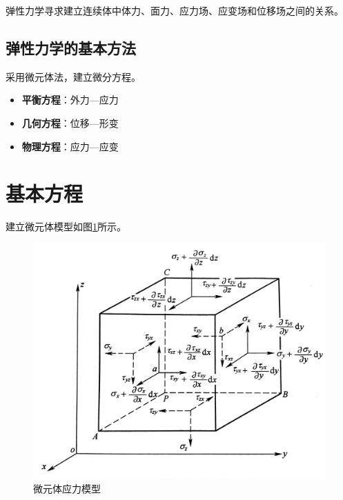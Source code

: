 \documentclass[10pt,a4]{article}
\numberwithin{equation}{section}
\begin{document}
	弹性力学寻求建立连续体中体力、面力、应力场、应变场和位移场之间的关系。
	\vspace*{0.5em}
	
	\subsection{弹性力学的基本方法}
	采用微元体法，建立微分方程。\vspace*{-0.5em}
	\begin{itemize}
		\item \textbf{平衡方程}：外力—应力\vspace*{-0.5em}
		\item \textbf{几何方程}：位移—形变\vspace*{-0.5em}
		\item \textbf{物理方程}：应力—应变
	\end{itemize}
	
	\section{基本方程}
	建立微元体模型如图\ref{微元体应力}所示。
	
	\begin{figure}[!thb]
		\centering
		\includegraphics[width=0.6\linewidth]{pic/微元体应力.png}
		\caption{微元体应力模型}
		\label{微元体应力}
	\end{figure}
	
\end{document}
